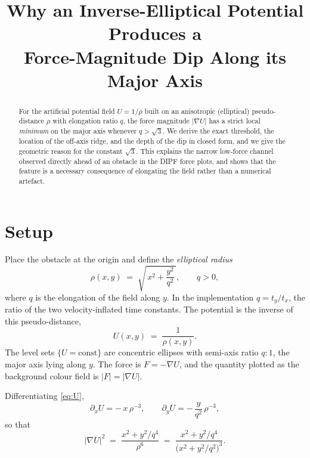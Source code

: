 \documentclass[11pt]{article}
\title{Why an Inverse-Elliptical Potential Produces a\\
       Force-Magnitude Dip Along its Major Axis}
\author{}
\date{}
\begin{document}
\maketitle

\begin{abstract}
For the artificial potential field $U=1/\rho$ built on an anisotropic
(elliptical) pseudo-distance $\rho$ with elongation ratio $q$, the force
magnitude $|\nabla U|$ has a strict local \emph{minimum} on the major axis
whenever $q>\sqrt{3}$. We derive the exact threshold, the location of the
off-axis ridge, and the depth of the dip in closed form, and we give the
geometric reason for the constant $\sqrt{3}$. This explains the narrow
low-force channel observed directly ahead of an obstacle in the DIPF force
plots, and shows that the feature is a necessary consequence of elongating
the field rather than a numerical artefact.
\end{abstract}

\section{Setup}

Place the obstacle at the origin and define the \emph{elliptical radius}
\begin{equation}
  \rho(x,y)\;=\;\sqrt{\,x^{2}+\frac{y^{2}}{q^{2}}\,},
  \qquad q>0 ,
  \label{eq:rho}
\end{equation}
where $q$ is the elongation of the field along $y$. In the implementation
$q=t_{y}/t_{x}$, the ratio of the two velocity-inflated time constants.
The potential is the inverse of this pseudo-distance,
\begin{equation}
  U(x,y)\;=\;\frac{1}{\rho(x,y)} .
  \label{eq:U}
\end{equation}
The level sets $\{U=\text{const}\}$ are concentric ellipses with semi-axis
ratio $q:1$, the major axis lying along $y$. The force is $F=-\nabla U$, and
the quantity plotted as the background colour field is $|F|=|\nabla U|$.

Differentiating \eqref{eq:U},
\begin{equation}
  \partial_{x}U=-\,x\,\rho^{-3},
  \qquad
  \partial_{y}U=-\,\frac{y}{q^{2}}\,\rho^{-3},
  \label{eq:partials}
\end{equation}
so that
\begin{equation}
  |\nabla U|^{2}
  \;=\;\frac{x^{2}+y^{2}/q^{4}}{\rho^{6}}
  \;=\;\frac{x^{2}+y^{2}/q^{4}}{\bigl(x^{2}+y^{2}/q^{2}\bigr)^{3}} .
  \label{eq:gradsq}
\end{equation}
\end{document}
